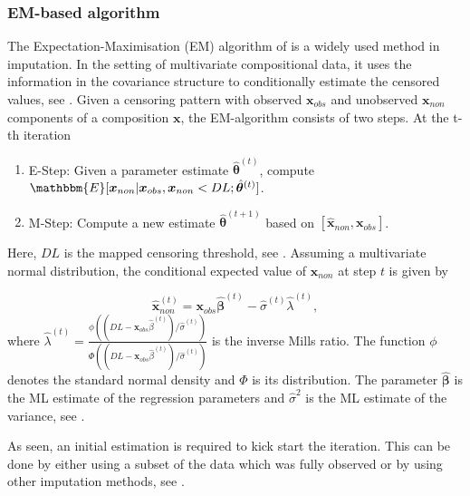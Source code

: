 \subsubsection{EM-based algorithm}
\label{sec:EM Algorithm}

The Expectation-Maximisation (EM) algorithm of \textcite{Dempster:1977} is a widely used method in imputation. In the setting of multivariate compositional data, it uses the information in the covariance structure to conditionally estimate the censored values, see \textcite{Palarea-Albaladejo:2015}. Given a censoring pattern with observed $\bm{x}_{obs}$ and unobserved $\bm{x}_{non}$ components of a composition $\bm{x}$, the EM-algorithm consists of two steps. At the t-th iteration

\begin{enumerate}
	\item E-Step: Given a parameter estimate $\hat{\bm{\theta}}^{(t)}$, compute $\mathbbm{E}[\bm{x}_{non}|\bm{x}_{obs},\bm{x}_{non} < DL; \hat{\bm{\theta}}^{(t)}]$.
	\item M-Step: Compute a new estimate $\hat{\bm{\theta}}^{(t+1)}$ based on $[\hat{\bm{x}}_{non},\bm{x}_{obs}]$.
\end{enumerate}

Here, $DL$ is the mapped censoring threshold, see \textcite{Palarea-Albaladejo:2015}. Assuming a multivariate normal distribution, the conditional expected value of $\bm{x}_{non}$ at step $t$ is given by

\begin{equation}
\hat{\bm{x}}_{non}^{(t)} = \bm{x}_{obs}\hat{\bm{\beta}}^{(t)} - \hat{\sigma}^{(t)}\hat{\lambda}^{(t)},
\label{eq:E-step}
\end{equation}
%
where $\hat{\lambda}^{(t)}=\frac{\phi((DL-\bm{x}_{obs}\hat{\beta}^{(t)})/\hat{\sigma}^{(t)})}{\Phi((DL-\bm{x}_{obs}\hat{\beta}^{(t)})/\hat{\sigma}^{(t)})}$ is the inverse Mills ratio. The function $\phi$ denotes the standard normal density and $\Phi$ is its distribution. The parameter $\hat{\bm{\beta}}$ is the ML estimate of the regression parameters and $\hat{\sigma}^2$ is the ML estimate of the variance, see \textcite{Palarea-Albaladejo:2015}. %

As seen, an initial estimation is required to kick start the iteration. This can be done by either using a subset of the data which was fully observed or by using other imputation methods, see \textcite{Palarea-Albaladejo:2015}. 


